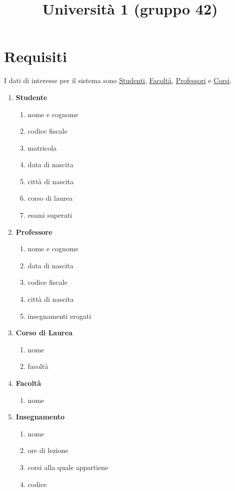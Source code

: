 \documentclass[12pt, letterpaper]{article}
\title{Università 1 (gruppo 42)}
\date{}
\begin{document}
\maketitle


\section{Requisiti}
I dati di interesse per il sistema sono \underline{Studenti}, \underline{Facoltà}, \underline{Professori} e \underline{Corsi}.
\begin{enumerate}
    \item \textbf{Studente}\begin{enumerate}
        \item nome e cognome
        \item codice fiscale 
        \item matricola 
        \item data di nascita 
        \item città di nascita 
        \item corso di laurea 
        \item esami superati
    \end{enumerate}
    \item \textbf{Professore}\begin{enumerate}
        \item nome e cognome
        \item data di nascita 
        \item codice fiscale 
        \item città di nascita 
        \item insegnamenti erogati
    \end{enumerate}
    \item \textbf{Corso di Laurea}\begin{enumerate}
        \item nome 
        \item facoltà
    \end{enumerate}
    \item \textbf{Facoltà}\begin{enumerate}
        \item nome
    \end{enumerate}
    \item \textbf{Insegnamento}\begin{enumerate}
        \item nome 
        \item ore di lezione 
        \item corsi alla quale appartiene
        \item codice
    \end{enumerate}
\end{enumerate}
\newpage
\end{document}
